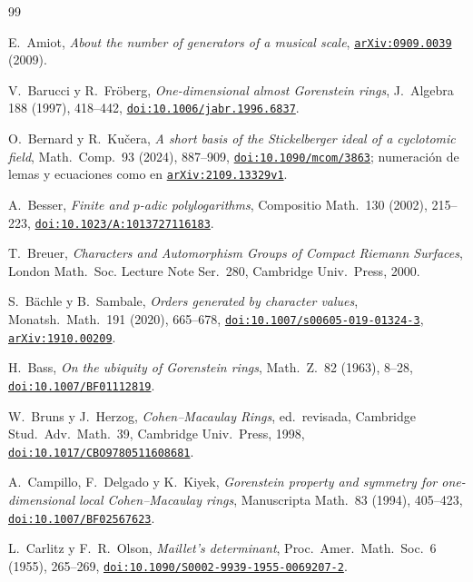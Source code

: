\documentclass[11pt,a4paper]{article}
\theoremstyle{definition}
\begin{document}
\renewcommand{\refname}{Referencias}
\begin{thebibliography}{99}\small\raggedright\setlength{\itemsep}{0pt}\setlength{\parskip}{0pt}
 E.~Amiot, \emph{About the number of generators of a musical scale}, \href{https://arxiv.org/abs/0909.0039}{\texttt{arXiv:0909.0039}} (2009).

 V.~Barucci y R.~Fröberg, \emph{One-dimensional almost Gorenstein rings}, J.~Algebra 188 (1997), 418--442, \href{https://doi.org/10.1006/jabr.1996.6837}{\texttt{doi:10.1006/jabr.1996.6837}}.

 O.~Bernard y R.~Kučera, \emph{A short basis of the Stickelberger ideal of a cyclotomic field}, Math.~Comp.~93 (2024), 887--909, \href{https://doi.org/10.1090/mcom/3863}{\texttt{doi:10.1090/mcom/3863}}; numeración de lemas y ecuaciones como en \href{https://arxiv.org/abs/2109.13329}{\texttt{arXiv:2109.13329v1}}.

 A.~Besser, \emph{Finite and $p$-adic polylogarithms}, Compositio Math.~130 (2002), 215--223, \href{https://doi.org/10.1023/A:1013727116183}{\texttt{doi:10.1023/A:1013727116183}}.

 T.~Breuer, \emph{Characters and Automorphism Groups of Compact Riemann Surfaces}, London Math.~Soc.
Lecture Note Ser.~280, Cambridge Univ.~Press, 2000.

 S.~B\"achle y B.~Sambale, \emph{Orders generated by character values}, Monatsh.~Math.~191 (2020), 665--678, \href{https://doi.org/10.1007/s00605-019-01324-3}{\texttt{doi:10.1007/s00605-019-01324-3}}, \href{https://arxiv.org/abs/1910.00209}{\texttt{arXiv:1910.00209}}.

 H.~Bass, \emph{On the ubiquity of Gorenstein rings}, Math.~Z.~82 (1963), 8--28, \href{https://doi.org/10.1007/BF01112819}{\texttt{doi:10.1007/BF01112819}}.

 W.~Bruns y J.~Herzog, \emph{Cohen--Macaulay Rings}, ed.~revisada, Cambridge Stud.~Adv.~Math.~39, Cambridge Univ.~Press, 1998, \href{https://doi.org/10.1017/CBO9780511608681}{\texttt{doi:10.1017/CBO9780511608681}}.

 A.~Campillo, F.~Delgado y K.~Kiyek, \emph{Gorenstein property and symmetry for one-dimensional local Cohen--Macaulay rings}, Manuscripta Math.~83 (1994), 405--423, \href{https://doi.org/10.1007/BF02567623}{\texttt{doi:10.1007/BF02567623}}.

 L.~Carlitz y F.~R.~Olson, \emph{Maillet's determinant}, Proc.~Amer.~Math.~Soc.~6 (1955), 265--269, \href{https://doi.org/10.1090/S0002-9939-1955-0069207-2}{\texttt{doi:10.1090/S0002-9939-1955-0069207-2}}.


\end{thebibliography}
\end{document}
